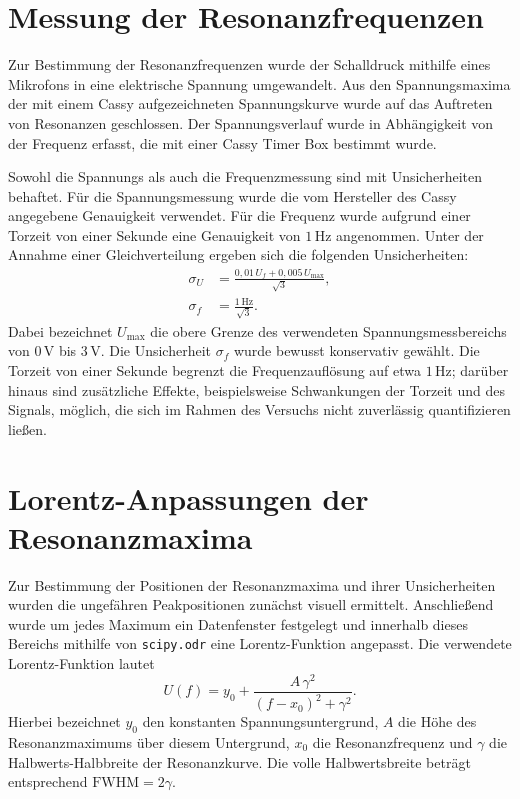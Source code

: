\documentclass[11pt,a4paper]{article}
\begin{document}
\section{Messung der Resonanzfrequenzen}

Zur Bestimmung der Resonanzfrequenzen wurde der Schalldruck mithilfe eines Mikrofons in eine elektrische Spannung umgewandelt. Aus den Spannungsmaxima der mit einem Cassy aufgezeichneten Spannungskurve wurde auf das Auftreten von Resonanzen geschlossen. Der Spannungsverlauf wurde in Abhängigkeit von der Frequenz erfasst, die mit einer Cassy Timer Box bestimmt wurde.

Sowohl die Spannungs als auch die Frequenzmessung sind mit Unsicherheiten behaftet. Für die Spannungsmessung wurde die vom Hersteller des Cassy angegebene Genauigkeit verwendet. Für die Frequenz wurde aufgrund einer Torzeit von einer Sekunde eine Genauigkeit von $\mathrm{1\,Hz}$ angenommen. Unter der Annahme einer Gleichverteilung ergeben sich die folgenden Unsicherheiten:
\begin{align}
  \sigma_U &= \frac{0{,}01\,U_f + 0{,}005\,U_{\max}}{\sqrt{3}},
    \label{eq:spannungunsicherheit} \\
  \sigma_f &= \frac{\mathrm{1\,Hz}}{\sqrt{3}}.
    \label{eq:frequenzunsicherheit}
\end{align}
Dabei bezeichnet $U_{\max}$ die obere Grenze des verwendeten Spannungsmessbereichs von $\mathrm{0\,V}$ bis $\mathrm{3\,V}$. Die Unsicherheit $\sigma_f$ wurde bewusst konservativ gewählt. Die Torzeit von einer Sekunde begrenzt die Frequenzauflösung auf etwa $\mathrm{1\,Hz}$; darüber hinaus sind zusätzliche Effekte, beispielsweise Schwankungen der Torzeit und des Signals, möglich, die sich im Rahmen des Versuchs nicht zuverlässig quantifizieren ließen.

\section{Lorentz-Anpassungen der Resonanzmaxima}

Zur Bestimmung der Positionen der Resonanzmaxima und ihrer Unsicherheiten wurden die ungefähren Peakpositionen zunächst visuell ermittelt. Anschließend wurde um jedes Maximum ein Datenfenster festgelegt und innerhalb dieses Bereichs mithilfe von \texttt{scipy.odr} eine Lorentz-Funktion angepasst. Die verwendete Lorentz-Funktion lautet
\begin{equation}
  U(f) = y_0 + \frac{A\,\gamma^2}{(f-x_0)^2 + \gamma^2}.
  \label{eq:lorentzfunktion}
\end{equation}
Hierbei bezeichnet $y_0$ den konstanten Spannungsuntergrund, $A$ die Höhe des Resonanzmaximums über diesem Untergrund, $x_0$ die Resonanzfrequenz und $\gamma$ die Halbwerts-Halbbreite der Resonanzkurve. Die volle Halbwertsbreite beträgt entsprechend $\mathrm{FWHM}=2\gamma$.
\end{document}
